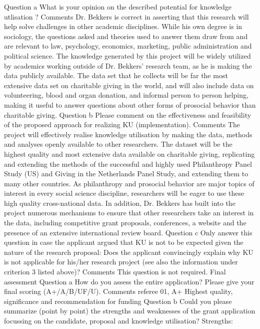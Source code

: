 \documentclass[twocolumn, serif, rga, numeric]{jote-article}
\begin{document}
Question a
What is your opinion on the described potential for knowledge utlisation ?
Comments
Dr. Bekkers is correct in asserting that this research will help solve challenges in other academic disciplines. While his own degree is in sociology, the questions asked and theories used to answer them draw from and are relevant to law, psychology, economics, marketing, public administration and political science.   The knowledge generated by this project will be widely utilized by academics working outside of Dr. Bekkers' research team, as he is making the data publicly available. The data set that he collects will be far the most extensive data set on charitable giving in the world, and will also include data on volunteering, blood and organ donation, and informal person to person helping, making it useful to answer questions about other forms of prosocial behavior than charitable giving.
Question b
Please comment on the effectiveness and feasibility of the proposed approach for realizing KU (implementation).
Comments
The project will effectively realise knowledge utilisation by making the data, methods and analyses openly available to other researchers. The dataset will be the highest quality and most extensive data available on charitable giving, replicating and extending the methods of the successful and highly used Philanthropy Panel Study (US) and Giving in the Netherlands Panel Study, and extending them to many other countries. As philanthropy and prosocial behavior are major topics of interest in every social science discipline, researchers will be eager to use these high quality cross-national data. In addition, Dr. Bekkers has built into the project numerous mechanisms to ensure that other researchers take an interest in the data, including competitive grant proposals, conferences, a website and the presence of an extensive international review board.
Question c
Only answer this question in case the applicant argued that KU is not to be expected given the nature of the research proposal: Does the applicant convincingly explain why KU is not applicable for his/her research project (see also the information under criterion 3 listed above)?
Comments
This question is not required.
Final assessment
Question a
How do you assess the entire application? Please give your final scoring (A+/A/B/UF/U).
Comments referee 
01, A+ Highest quality, significance and recommendation for funding
Question b
Could you please summarize (point by point) the strengths and weaknesses of the grant application focussing on the candidate, proposal and knowledge utilisation? Strengths:
\end{document}
